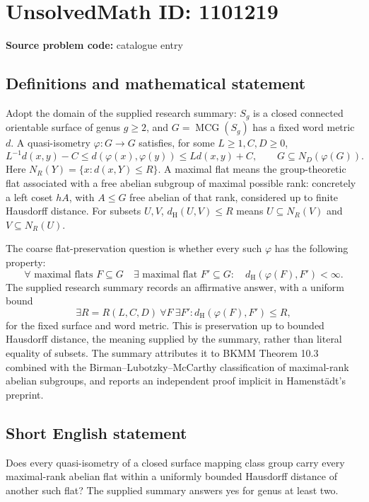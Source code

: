 \documentclass[11pt]{article}
\begin{document}
\section*{UnsolvedMath ID: 1101219}
\textbf{Source problem code:} catalogue entry
\subsection{Definitions and mathematical statement}
Adopt the domain of the supplied research summary: \(S_g\) is a closed connected orientable surface of genus \(g\ge2\), and \(G=\operatorname{MCG}(S_g)\) has a fixed word metric \(d\). A quasi-isometry \(\varphi:G\to G\) satisfies, for some \(L\ge1,C,D\ge0\),
\[
L^{-1}d(x,y)-C\le d(\varphi(x),\varphi(y))\le Ld(x,y)+C,
\qquad G\subseteq N_D(\varphi(G)).
\]
Here \(N_R(Y)=\{x:d(x,Y)\le R\}\). A maximal flat means the group-theoretic flat associated with a free abelian subgroup of maximal possible rank: concretely a left coset \(hA\), with \(A\le G\) free abelian of that rank, considered up to finite Hausdorff distance. For subsets \(U,V\), \(d_{\mathrm H}(U,V)\le R\) means \(U\subseteq N_R(V)\) and \(V\subseteq N_R(U)\).

The coarse flat-preservation question is whether every such \(\varphi\) has the following property:
\[
\forall\text{ maximal flats }F\subseteq G\quad
\exists\text{ maximal flat }F'\subseteq G:\quad
 d_{\mathrm H}(\varphi(F),F')<\infty.
\]
The supplied research summary records an affirmative answer, with a uniform bound
\[
\exists R=R(L,C,D)\ \forall F\ \exists F':
 d_{\mathrm H}(\varphi(F),F')\le R,
\]
for the fixed surface and word metric. This is preservation up to bounded Hausdorff distance, the meaning supplied by the summary, rather than literal equality of subsets. The summary attributes it to BKMM Theorem 10.3 combined with the Birman--Lubotzky--McCarthy classification of maximal-rank abelian subgroups, and reports an independent proof implicit in Hamenst\"adt's preprint.
\subsection{Short English statement}
Does every quasi-isometry of a closed surface mapping class group carry every maximal-rank abelian flat within a uniformly bounded Hausdorff distance of another such flat? The supplied summary answers yes for genus at least two.
\end{document}
